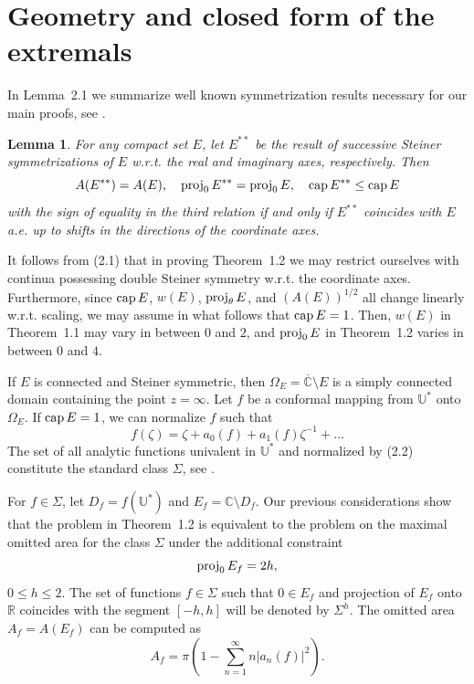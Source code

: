 \documentclass[11pt]{pjm}
\newtheorem{lemma}[theorem]{Lemma}
\newcommand{\be}{\begin{equation}}
\newcommand{\eeq}{\end{equation}}
\newcommand{\bl}{\begin{lemma}}
\newcommand{\el}{\end{lemma}}
\newcommand{\CAP}{{\rm cap}\,}
\newcommand{\proj}{{\rm proj}_0\,}
\newcommand{\projth}{{\rm proj}_\theta\,}
\newcommand{\R}{{\mathbb R}}
\newcommand{\C}{{\mathbb{C}}}
\newcommand{\U}{{\mathbb{U}}}
\newcommand{\CC}{\overline{\C}}
\begin{document}
\section{Geometry and closed form of the extremals}
\setcounter{equation}{0}



In Lemma~2.1 we summarize  well known symmetrization results necessary for our main proofs, see \cite{D,H,BS,BPS}. 

\bl
For any compact set $E$, let $E^{**}$ be the result of successive Steiner symmetrizations
of $E$ w.r.t. the real and imaginary axes, respectively. Then
\be
A(E^{**})=A(E),\quad    \proj E^{**}= \proj E,\quad   \CAP E^{**}\le \CAP E
\eeq
with the sign of equality in the third relation if and only if $E^{**}$ coincides with $E$ a.e. up to shifts in the 
directions of the coordinate axes.
\el


It follows from (2.1) that in proving Theorem~1.2 we may restrict ourselves with continua possessing double
Steiner symmetry w.r.t. the coordinate axes. Furthermore, since $\CAP E$, $w(E)$, $\projth E$, and $(A(E))^{1/2}$ all change
linearly w.r.t. scaling,  we may assume in what follows that $\CAP E=1$. Then, $w(E)$ in Theorem~1.1  may vary in 
between $0$ and $2$,  and $\proj E$ in Theorem~1.2  varies in between $0$ and $4$.

\medskip

If $E$ is connected and Steiner symmetric, then $\Omega_E=\CC\setminus E$ is a simply connected domain
containing the point $z=\infty$. Let $f$ be a conformal mapping from $\U^*$ onto $\Omega_E$. If $\CAP E=1$, we can normalize $f$ such that
\be
f(\zeta)=\zeta +a_0(f)+a_1(f)\zeta^{-1}+\ldots
\eeq
The set of all analytic functions univalent in $\U^*$ and normalized by (2.2) constitute the standard class $\Sigma$, see \cite{D,Du,J}.

For $f\in \Sigma$, let $D_f=f(\U^*)$ and $E_f=\C\setminus D_f$.
Our previous considerations show that the problem in Theorem~1.2  is equivalent to the problem on the maximal omitted
area for the class $\Sigma$ under the additional constraint
$$
\proj E_f =2h,
$$
$0\le h \le 2$. The set of functions $f\in \Sigma$ such that
$0\in E_f$ and projection of $E_f$ onto $\R$ coincides with the segment $[-h,h]$ will be denoted by $\Sigma^h$. 
The omitted area $A_f=A(E_f)$ can be computed as
$$
A_f=\pi \left(1-\sum_{n=1}^\infty n |a_n(f)|^2\right).
$$
\end{document}
